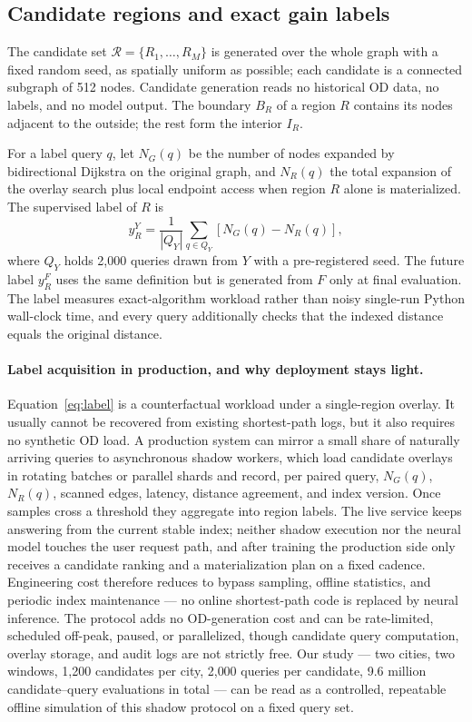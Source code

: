 \documentclass[5p,twocolumn,authoryear]{elsarticle}
\begin{document}
\subsection{Candidate regions and exact gain labels}

The candidate set $\mathcal{R}=\{R_1,\ldots,R_M\}$ is generated over the whole graph with a
fixed random seed, as spatially uniform as possible; each candidate is a connected subgraph
of 512 nodes. Candidate generation reads no historical OD data, no labels, and no model
output. The boundary $B_R$ of a region $R$ contains its nodes adjacent to the outside; the
rest form the interior $I_R$.

For a label query $q$, let $N_G(q)$ be the number of nodes expanded by bidirectional
Dijkstra on the original graph, and $N_R(q)$ the total expansion of the overlay search plus
local endpoint access when region $R$ alone is materialized. The supervised label of $R$ is
\begin{equation}
  y_R^{Y}=\frac{1}{|Q_Y|}\sum_{q\in Q_Y}\left[N_G(q)-N_R(q)\right],
  \label{eq:label}
\end{equation}
where $Q_Y$ holds 2{,}000 queries drawn from $Y$ with a pre-registered seed. The future
label $y_R^F$ uses the same definition but is generated from $F$ only at final evaluation.
The label measures exact-algorithm workload rather than noisy single-run Python wall-clock
time, and every query additionally checks that the indexed distance equals the original
distance.

\paragraph{Label acquisition in production, and why deployment stays light.}
Equation~\eqref{eq:label} is a counterfactual workload under a single-region overlay. It
usually cannot be recovered from existing shortest-path logs, but it also requires no
synthetic OD load. A production system can mirror a small share of naturally arriving
queries to asynchronous shadow workers, which load candidate overlays in rotating batches or
parallel shards and record, per paired query, $N_G(q)$, $N_R(q)$, scanned edges, latency,
distance agreement, and index version. Once samples cross a threshold they aggregate into
region labels. The live service keeps answering from the current stable index; neither
shadow execution nor the neural model touches the user request path, and after training the
production side only receives a candidate ranking and a materialization plan on a fixed
cadence. Engineering cost therefore reduces to bypass sampling, offline statistics, and
periodic index maintenance --- no online shortest-path code is replaced by neural inference.
The protocol adds no OD-generation cost and can be rate-limited, scheduled off-peak,
paused, or parallelized, though candidate query computation, overlay storage, and audit
logs are not strictly free. Our study --- two cities, two windows, 1{,}200 candidates per
city, 2{,}000 queries per candidate, 9.6 million candidate--query evaluations in total ---
can be read as a controlled, repeatable offline simulation of this shadow protocol on a
fixed query set.
\end{document}
